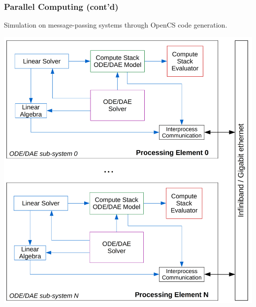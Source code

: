 \documentclass[compress,newPxFont,sthlmFooter]{beamer}
\begin{document}
\begin{frame}[plain]
\frametitle{Parallel Computing (cont'd)}
    Simulation on \alert{message-passing} systems through OpenCS code generation.
    \begin{center}
        \includegraphics[align=c, height=0.70\paperheight]{Simulation-DistributedMemorySystems.png}
    \end{center}
\end{frame}
\end{document}
